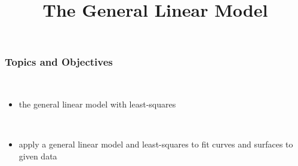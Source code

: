 \title{The General Linear Model}
\subtitle{\SubTitleName}
\institute[]{\Course}
\author{\Instructor}
\maketitle   


\begin{frame}\frametitle{Topics and Objectives}
     \\
    \begin{itemize}
    
        \item the general linear model with least-squares
        
    \end{itemize}
    
    \vspace{0.5cm}
    
    \\
    
    \begin{itemize}
    
        \item apply a general linear model and least-squares to fit curves and surfaces to given data
      
    \end{itemize}
    
    \vspace{0.25cm} 
 
\end{frame}
 

    
    
    
    
 
